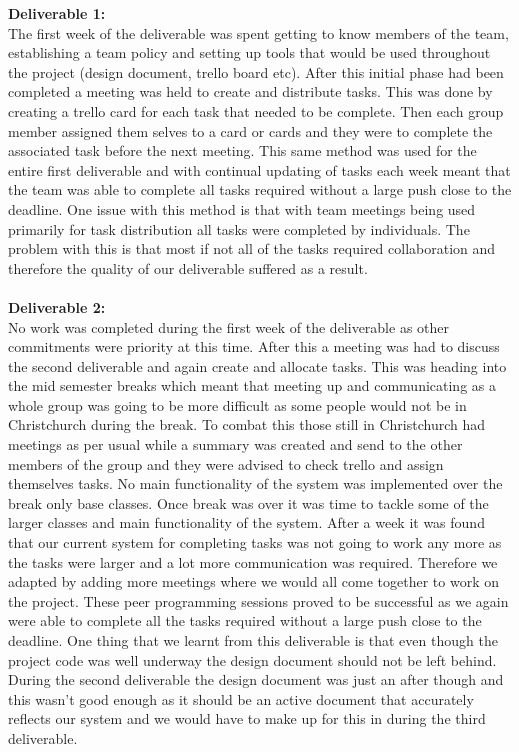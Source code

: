 \textbf{Deliverable 1:\\}
The first week of the deliverable was spent getting to know members of the team, establishing a team policy and setting up tools that would be used throughout the project (design document, trello board etc). After this initial phase had been completed a meeting was held to create and distribute tasks. This was done by creating a trello card for each task that needed to be complete. Then each group member assigned them selves to a card or cards and they were to complete the associated task before the next meeting. This same method was used for the entire first deliverable and with continual updating of tasks each week meant that the team was able to complete all tasks required without a large push close to the deadline. One issue with this method is that with team meetings being used primarily for task distribution all tasks were completed by individuals. The problem with this is that most if not all of the tasks required collaboration and therefore the quality of our deliverable suffered as a result.\\
\\
\textbf{Deliverable 2:\\}
No work was completed during the first week of the deliverable as other commitments were priority at this time. After this a meeting was had to discuss the second deliverable and again create and allocate tasks. This was heading into the mid semester breaks which meant that meeting up and communicating as a whole group was going to be more difficult as some people would not be in Christchurch during the break. To combat this those still in Christchurch had meetings as per usual while a summary was created and send to the other members of the group and they were advised to check trello and assign themselves tasks. No main functionality of the system was implemented over the break only base classes. Once break was over it was time to tackle some of the larger classes and main functionality of the system. After a week it was found that our current system for completing tasks was not going to work any more as the tasks were larger and a lot more communication was required. Therefore we adapted by adding more meetings where we would all come together to work on the project. These peer programming sessions proved to be successful as we again were able to complete all the tasks required without a large push close to the deadline. One thing that we learnt from this deliverable is that even though the project code was well underway the design document should not be left behind. During the second deliverable the design document was just an after though and this wasn't good enough as it should be an active document that accurately reflects our system and we would have to make up for this in during the third deliverable.\\
